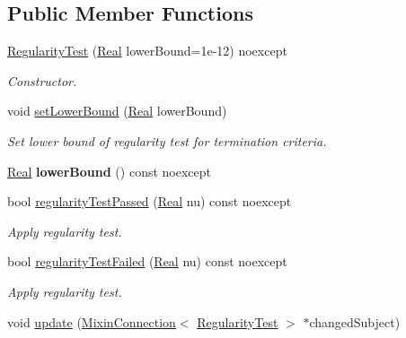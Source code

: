 \subsection*{Public Member Functions}
\begin{DoxyCompactItemize}
\item 
\hyperlink{classSpacy_1_1Mixin_1_1RegularityTest_ae2887fec9a5bdd42239b3df6750bf2e9}{Regularity\+Test} (\hyperlink{classSpacy_1_1Real}{Real} lower\+Bound=1e-\/12) noexcept
\begin{DoxyCompactList}\small\item\em Constructor. \end{DoxyCompactList}\item 
\hypertarget{classSpacy_1_1Mixin_1_1RegularityTest_a051394f2ffb0abd9a26ab7a64c590eee}{}void \hyperlink{classSpacy_1_1Mixin_1_1RegularityTest_a051394f2ffb0abd9a26ab7a64c590eee}{set\+Lower\+Bound} (\hyperlink{classSpacy_1_1Real}{Real} lower\+Bound)\label{classSpacy_1_1Mixin_1_1RegularityTest_a051394f2ffb0abd9a26ab7a64c590eee}

\begin{DoxyCompactList}\small\item\em Set lower bound of regularity test for termination criteria. \end{DoxyCompactList}\item 
\hypertarget{classSpacy_1_1Mixin_1_1RegularityTest_a8a807e4449e6b6b64e7e81834d331597}{}\hyperlink{classSpacy_1_1Real}{Real} {\bfseries lower\+Bound} () const noexcept\label{classSpacy_1_1Mixin_1_1RegularityTest_a8a807e4449e6b6b64e7e81834d331597}

\item 
bool \hyperlink{classSpacy_1_1Mixin_1_1RegularityTest_afe2fd3259850b874a85779d4f562e7f6}{regularity\+Test\+Passed} (\hyperlink{classSpacy_1_1Real}{Real} nu) const noexcept
\begin{DoxyCompactList}\small\item\em Apply regularity test. \end{DoxyCompactList}\item 
bool \hyperlink{classSpacy_1_1Mixin_1_1RegularityTest_a26217e26765bb6f938224ea76612c8c0}{regularity\+Test\+Failed} (\hyperlink{classSpacy_1_1Real}{Real} nu) const noexcept
\begin{DoxyCompactList}\small\item\em Apply regularity test. \end{DoxyCompactList}\item 
\hypertarget{classSpacy_1_1Mixin_1_1RegularityTest_ae3bfc55bec9fe3068adffb6d24b3b964}{}void \hyperlink{classSpacy_1_1Mixin_1_1RegularityTest_ae3bfc55bec9fe3068adffb6d24b3b964}{update} (\hyperlink{classSpacy_1_1Mixin_1_1MixinConnection}{Mixin\+Connection}$<$ \hyperlink{classSpacy_1_1Mixin_1_1RegularityTest}{Regularity\+Test} $>$ $\ast$changed\+Subject)\label{classSpacy_1_1Mixin_1_1RegularityTest_ae3bfc55bec9fe3068adffb6d24b3b964}


\end{DoxyCompactItemize}
